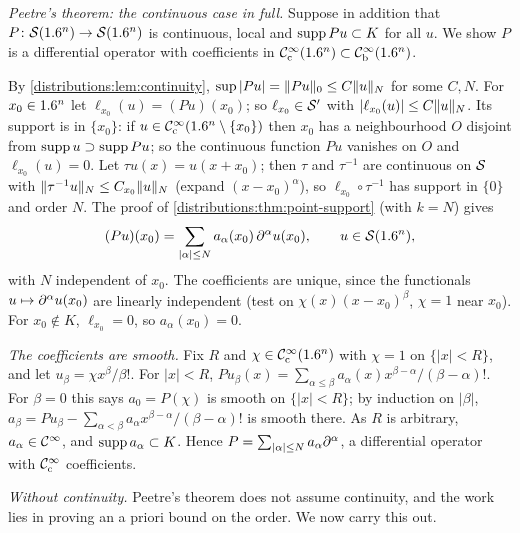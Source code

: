 \emph{Peetre's theorem: the continuous case in full.} Suppose in addition that
$P\colon\mathcal{S}(1.6^n)\to\mathcal{S}(1.6^n)$ is continuous, local and $\operatorname{supp} Pu\subset K$ for all $u$.
We show $P$ is a differential operator with coefficients in $\mathcal{C}^\infty_{\mathrm{c}}(1.6^n)\subset\mathcal{C}^\infty_{\mathrm{b}}(1.6^n)$.

By \cref{distributions:lem:continuity}, $\sup|Pu|=\lVert Pu\rVert_0\le C\lVert u\rVert_N$ for some
$C,N$. For $x_0\in1.6^n$ let $\ell_{x_0}(u)=(Pu)(x_0)$; so $\ell_{x_0}\in\mathcal{S}'$ with
$|\ell_{x_0}(u)|\le C\lVert u\rVert_N$. Its support is in $\{x_0\}$: if
$u\in\mathcal{C}^\infty_{\mathrm{c}}(1.6^n\setminus\{x_0\})$ then $x_0$ has a neighbourhood $O$ disjoint from
$\operatorname{supp} u\supset\operatorname{supp} Pu$; so the continuous function $Pu$ vanishes on $O$ and
$\ell_{x_0}(u)=0$. Let $\tau u(x)=u(x+x_0)$; then $\tau$ and $\tau^{-1}$ are continuous
on $\mathcal{S}$ with $\lVert \tau^{-1}u\rVert_N\le C_{x_0}\lVert u\rVert_N$ (expand $(x-x_0)^\alpha$), so
$\ell_{x_0}\circ\tau^{-1}$ has support in $\{0\}$ and order $N$. The proof of
\cref{distributions:thm:point-support} (with $k=N$) gives
\[
  (Pu)(x_0)=\sum_{|\alpha|\le N}a_\alpha(x_0)\,\partial^\alpha u(x_0),\qquad u\in\mathcal{S}(1.6^n),
\]
with $N$ independent of $x_0$. The coefficients are unique, since the functionals
$u\mapsto\partial^\alpha u(x_0)$ are linearly independent (test on $\chi(x)(x-x_0)^\beta$,
$\chi=1$ near $x_0$). For $x_0\notin K$, $\ell_{x_0}=0$, so $a_\alpha(x_0)=0$.

\emph{The coefficients are smooth.} Fix $R$ and $\chi\in\mathcal{C}^\infty_{\mathrm{c}}(1.6^n)$ with $\chi=1$ on
$\{|x|<R\}$, and let $u_\beta=\chi x^\beta/\beta!$. For $|x|<R$,
$Pu_\beta(x)=\sum_{\alpha\le\beta}a_\alpha(x)x^{\beta-\alpha}/(\beta-\alpha)!$. For
$\beta=0$ this says $a_0=P(\chi)$ is smooth on $\{|x|<R\}$; by induction on $|\beta|$,
$a_\beta=Pu_\beta-\sum_{\alpha<\beta}a_\alpha x^{\beta-\alpha}/(\beta-\alpha)!$ is smooth there.
As $R$ is arbitrary, $a_\alpha\in\mathcal{C}^\infty$, and $\operatorname{supp} a_\alpha\subset K$. Hence
$P=\sum_{|\alpha|\le N}a_\alpha\partial^\alpha$, a differential operator with
$\mathcal{C}^\infty_{\mathrm{c}}$ coefficients.

\emph{Without continuity.} Peetre's theorem does not assume continuity, and the work
lies in proving an a priori bound on the order. We now carry this out.

